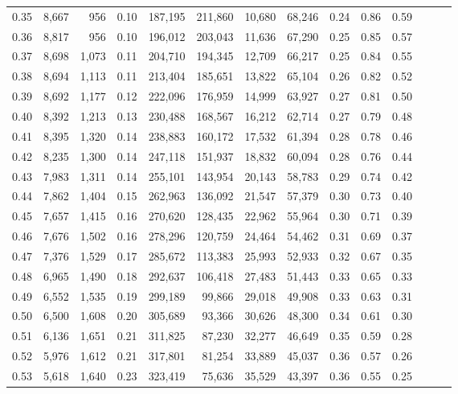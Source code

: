 \begin{tabular}{rrrrrrrrrrrrrr}
0.35 &  8,667 &    956 &  0.10 &  187,195 &  211,860 &  10,680 &  68,246 &  0.24 &  0.86 &      0.59 \\
0.36 &  8,817 &    956 &  0.10 &  196,012 &  203,043 &  11,636 &  67,290 &  0.25 &  0.85 &      0.57 \\
0.37 &  8,698 &  1,073 &  0.11 &  204,710 &  194,345 &  12,709 &  66,217 &  0.25 &  0.84 &      0.55 \\
0.38 &  8,694 &  1,113 &  0.11 &  213,404 &  185,651 &  13,822 &  65,104 &  0.26 &  0.82 &      0.52 \\
0.39 &  8,692 &  1,177 &  0.12 &  222,096 &  176,959 &  14,999 &  63,927 &  0.27 &  0.81 &      0.50 \\
0.40 &  8,392 &  1,213 &  0.13 &  230,488 &  168,567 &  16,212 &  62,714 &  0.27 &  0.79 &      0.48 \\
0.41 &  8,395 &  1,320 &  0.14 &  238,883 &  160,172 &  17,532 &  61,394 &  0.28 &  0.78 &      0.46 \\
0.42 &  8,235 &  1,300 &  0.14 &  247,118 &  151,937 &  18,832 &  60,094 &  0.28 &  0.76 &      0.44 \\
0.43 &  7,983 &  1,311 &  0.14 &  255,101 &  143,954 &  20,143 &  58,783 &  0.29 &  0.74 &      0.42 \\
0.44 &  7,862 &  1,404 &  0.15 &  262,963 &  136,092 &  21,547 &  57,379 &  0.30 &  0.73 &      0.40 \\
0.45 &  7,657 &  1,415 &  0.16 &  270,620 &  128,435 &  22,962 &  55,964 &  0.30 &  0.71 &      0.39 \\
0.46 &  7,676 &  1,502 &  0.16 &  278,296 &  120,759 &  24,464 &  54,462 &  0.31 &  0.69 &      0.37 \\
0.47 &  7,376 &  1,529 &  0.17 &  285,672 &  113,383 &  25,993 &  52,933 &  0.32 &  0.67 &      0.35 \\
0.48 &  6,965 &  1,490 &  0.18 &  292,637 &  106,418 &  27,483 &  51,443 &  0.33 &  0.65 &      0.33 \\
0.49 &  6,552 &  1,535 &  0.19 &  299,189 &   99,866 &  29,018 &  49,908 &  0.33 &  0.63 &      0.31 \\
0.50 &  6,500 &  1,608 &  0.20 &  305,689 &   93,366 &  30,626 &  48,300 &  0.34 &  0.61 &      0.30 \\
0.51 &  6,136 &  1,651 &  0.21 &  311,825 &   87,230 &  32,277 &  46,649 &  0.35 &  0.59 &      0.28 \\
0.52 &  5,976 &  1,612 &  0.21 &  317,801 &   81,254 &  33,889 &  45,037 &  0.36 &  0.57 &      0.26 \\
0.53 &  5,618 &  1,640 &  0.23 &  323,419 &   75,636 &  35,529 &  43,397 &  0.36 &  0.55 &      0.25 \\

\end{tabular}
